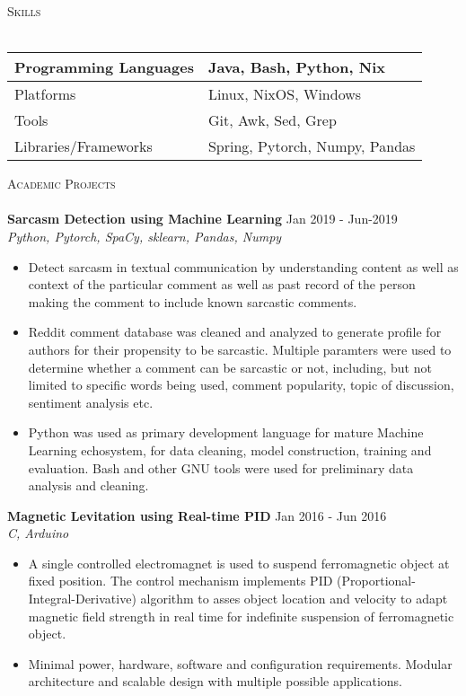 \documentclass[a4paper]{article}
\newcommand{\lineunder} {
    \vspace*{-8pt} \\
    \hspace*{-18pt} \hrulefill \\
}
\newcommand{\header} [1] {
    {\hspace*{-18pt}\vspace*{6pt} \textsc{#1}}
    \vspace*{-6pt} \lineunder
}
\begin{document}
\header{Skills}
\vspace{1mm}
{\renewcommand{\arraystretch}{1.5}%
\begin{tabularx}{\textwidth}{ | X | X | }
  \hline
	Programming Languages & Java, Bash, Python, Nix        \\
  \hline
	Platforms             & Linux, NixOS, Windows          \\
  \hline
	Tools                 & Git, Awk, Sed, Grep            \\
  \hline
	Libraries/Frameworks  & Spring, Pytorch, Numpy, Pandas \\
  \hline
\end{tabularx}
\vspace{2mm}

\pagebreak
\header{Academic Projects}
\vspace{1mm}
{\textbf{Sarcasm Detection using Machine Learning}} \hfill Jan 2019 - Jun-2019\\
\textit{Python, Pytorch, SpaCy, sklearn, Pandas, Numpy} \\
\begin{itemize}
    \item Detect sarcasm in textual communication by understanding content as well as context of the particular comment as well as past record of the person making the comment to include known sarcastic comments.\\
  \item Reddit comment database was cleaned and analyzed to generate profile for authors for their propensity to be sarcastic. Multiple paramters were used to determine whether a comment can be sarcastic or not, including, but not limited to specific words being used, comment popularity, topic of discussion, sentiment analysis etc.
  \item Python was used as primary development language for mature Machine Learning echosystem, for data cleaning, model construction, training and evaluation. Bash and other GNU tools were used for preliminary data analysis and cleaning.
\end{itemize}
\vspace*{2mm}

{\textbf{Magnetic Levitation using Real-time PID}} \hfill Jan 2016 - Jun 2016\\
\textit{C, Arduino} \\
\begin{itemize}
    \item A single controlled electromagnet is used to suspend ferromagnetic object at fixed position. The control mechanism implements PID (Proportional-Integral-Derivative) algorithm to asses object location and velocity to adapt magnetic field strength in real time for indefinite suspension of ferromagnetic object.\\
  \item Minimal power, hardware, software and configuration requirements. Modular architecture and scalable design with multiple possible applications.
\end{itemize}
\vspace*{2mm}

}
\end{document}

